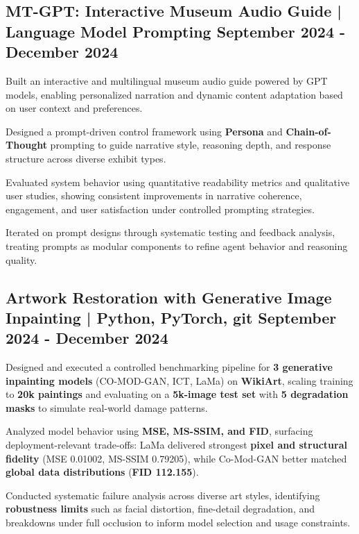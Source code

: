 
\subsection{{MT-GPT: Interactive Museum Audio Guide | Language Model Prompting  \hfill September 2024 - December 2024}}
\begin{zitemize}
    \item Built an interactive and multilingual museum audio guide powered by GPT models, enabling personalized narration and dynamic content adaptation based on user context and preferences.

    \item Designed a prompt-driven control framework using \textbf{Persona} and \textbf{Chain-of-Thought} prompting to guide narrative style, reasoning depth, and response structure across diverse exhibit types.
    
    \item Evaluated system behavior using quantitative readability metrics and qualitative user studies, showing consistent improvements in narrative coherence, engagement, and user satisfaction under controlled prompting strategies.
    
    \item Iterated on prompt designs through systematic testing and feedback analysis, treating prompts as modular components to refine agent behavior and reasoning quality.

\end{zitemize}


\subsection{{Artwork Restoration with Generative Image Inpainting | Python, PyTorch, git  \hfill September 2024 - December 2024}}
\begin{zitemize}
    \item Designed and executed a controlled benchmarking pipeline for \textbf{3 generative inpainting models} (CO-MOD-GAN, ICT, LaMa) on \textbf{WikiArt}, scaling training to \textbf{20k paintings} and evaluating on a \textbf{5k-image test set} with \textbf{5 degradation masks} to simulate real-world damage patterns.

    \item Analyzed model behavior using \textbf{MSE, MS-SSIM, and FID}, surfacing deployment-relevant trade-offs: LaMa delivered strongest \textbf{pixel and structural fidelity} (MSE 0.01002, MS-SSIM 0.79205), while Co-Mod-GAN better matched \textbf{global data distributions} (\textbf{FID 112.155}).

    \item Conducted systematic failure analysis across diverse art styles, identifying \textbf{robustness limits} such as facial distortion, fine-detail degradation, and breakdowns under full occlusion to inform model selection and usage constraints.
\end{zitemize}





